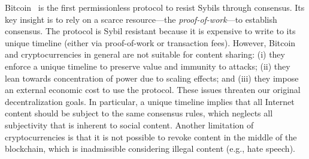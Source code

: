 \documentclass[10pt,journal,compsoc]{IEEEtran}
\begin{document}
Bitcoin~\cite{p2p.bitcoin} is the first permissionless protocol to resist
Sybils through consensus.
Its key insight is to rely on a scarce resource---the \emph{proof-of-work}---to
establish consensus.
The protocol is Sybil resistant because it is expensive to write to its
unique timeline (either via proof-of-work or transaction fees).
%
However, Bitcoin and cryptocurrencies in general are not suitable for content
sharing:
    (i)   they enforce a unique timeline to preserve value and immunity to
          attacks;
    (ii)  they lean towards concentration of power due to scaling effects; and
    (iii) they impose an external economic cost to use the protocol.
These issues threaten our original decentralization goals.
In particular, a unique timeline implies that all Internet content should be
subject to the same consensus rules, which neglects all subjectivity that is
inherent to social content.
Another limitation of cryptocurrencies is that it is not possible to revoke
content in the middle of the blockchain, which is inadmissible considering
illegal content (e.g., hate speech).
\end{document}
